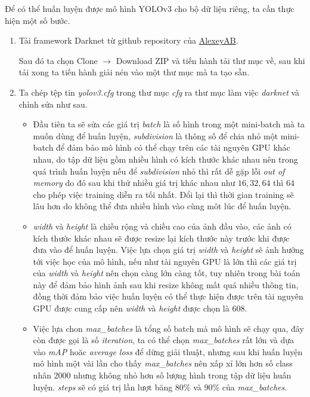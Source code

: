 Để có thể huấn luyện được mô hình YOLOv3 cho bộ dữ liệu riêng, ta cần thực hiện một số bước.
\begin{enumerate}
	\item Tải framework Darknet từ github repository của \href{https://github.com/AlexeyAB/darknet}{AlexeyAB}.
	
\noindent{}

	Sau đó ta chọn Clone $\rightarrow$ Download ZIP và tiến hành tải thư mục về, sau khi tải xong ta tiến hành giải nén vào một thư mục mà ta tạo sẵn.
	\item Ta chép tệp tin \emph{yolov3.cfg} trong thư mục \emph{cfg} ra thư mục làm việc \emph{darknet} và chỉnh sửa như sau.
	\begin{itemize}
	\item Đầu tiên ta sẽ sửa các giá trị \emph{batch} là số hình trong một mini-batch mà ta muốn dùng để huấn luyện, \emph{subdivision} là thông số để chia nhỏ một mini-batch để đảm bảo mô hình có thể chạy trên các tài nguyên GPU khác nhau, do tập dữ liệu gồm nhiều hình có kích thước khác nhau nên trong quá trình huấn luyện nếu để \emph{subdivision} nhỏ thì rất dễ gặp lỗi \emph{out of memory} do đó sau khi thử nhiều giá trị khác nhau như $16, 32, 64$ thì $64$ cho phép việc training diễn ra tối nhất. Đổi lại thì thời gian training sẽ lâu hơn do không thể đưa nhiều hình vào cùng môt lúc để huấn luyện.	
	\item \emph{width} và \emph{height} là chiều rộng và chiều cao của ảnh đầu vào, các ảnh có kích thước khác nhau sẽ được resize lại kích thước này trước khi được đưa vào để huấn luyện. Việc lựa chọn giá trị \emph{width} và \emph{height} sẽ ảnh hưởng tới việc học của mô hình, nếu như tài nguyên GPU là lớn thì các giá trị của \emph{width} và \emph{height} nên chọn càng lớn càng tốt, tuy nhiên trong bài toán này để đảm bảo hình ảnh sau khi resize không mất quá nhiều thông tin, đồng thời đảm bảo việc huấn luyện có thể thực hiện được trên tài nguyên GPU được cung cấp nên \emph{width} và \emph{height} được chọn là $608$.
	\item Việc lựa chon \emph{max{\_}batches} là tổng số batch mà mô hình sẽ chạy qua, đây còn được gọi là số \emph{iteration}, ta có thể chọn \emph{max{\_}batches} rất lớn và dựa vào \emph{mAP} hoăc \emph{average loss} để dừng giải thuật, nhưng sau khi huấn luyện mô hình một vài lần cho thấy \emph{max{\_}batches} nên xấp xỉ lớn hơn số class nhân $2000$ nhưng không nhỏ hơn số lượng hình trong tập dữ liệu huấn luyện. \emph{steps} sẽ có giá trị lần lượt băng $80\%$ và $90\%$ của \emph{max{\_}batches}.
	\end{itemize}



\end{enumerate}
